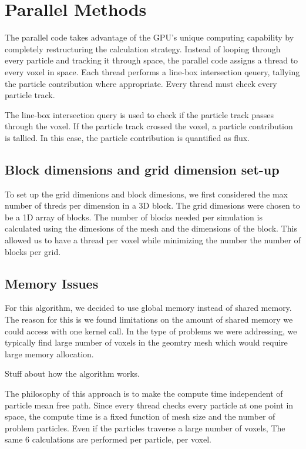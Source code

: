 \section{Parallel Methods}
The parallel code takes advantage of the GPU's unique computing capability by
completely restructuring the calculation strategy. Instead of looping through
every particle and tracking it through space, the parallel code assigns a thread
to every voxel in space. Each thread performs a line-box intersection qeuery,
tallying the particle contribution where appropriate. Every thread must check
every particle track. 

The line-box intersection query is used to check if the particle track passes 
through the voxel. If the particle track crossed the voxel, a particle contribution 
is tallied. In this case, the particle contribution is quantified as flux. 

\subsection{Block dimensions and grid dimension set-up}
To set up the grid dimenions and block dimesions, we first considered the max number of 
threds per dimension in a 3D block. 
The grid dimesions were chosen to be a 1D array of blocks. The number of blocks 
needed per simulation is calculated using the dimesions of the mesh and the 
dimensions of the block. This allowed us to have a thread per voxel  while 
minimizing the number the number of blocks per grid. 

\subsection{Memory Issues}
For this algorithm, we decided to use global memory instead of shared memory. 
The reason for this is we found limitations on the amount of shared memory we 
could access with one kernel call. In the type of problems we were addressing, 
we typically find large number of voxels in the geomtry mesh which would require 
large memory allocation. 
 
 
Stuff about how the algorithm works.

The philosophy of this approach is to make the compute time independent of
particle mean free path. Since every thread checks every particle at one point
in space, the compute time is a fixed function of mesh size and the number of
problem particles. Even if the particles traverse a large number of voxels, The
same 6 calculations are performed per particle, per voxel.

